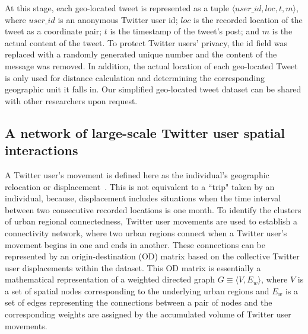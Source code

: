 \documentclass[]{tGIS2e}
\begin{document}
At this stage, each geo-located tweet is represented as a tuple $\langle user\_id, loc, t, m \rangle$, where $user\_id$ is an anonymous Twitter user id; $loc$ is the recorded location of the tweet as a coordinate pair; $t$ is the timestamp of the tweet's post; and $m$ is the actual content of the tweet. 
To protect Twitter users’ privacy, the id field was replaced with a randomly generated unique number and the content of the message was removed.
In addition, the actual location of each geo-located Tweet is only used for distance calculation and determining the corresponding geographic unit it falls in. 
Our simplified geo-located tweet dataset can be shared with other researchers upon request.

\subsection{A network of large-scale Twitter user spatial interactions}
A Twitter user's movement is defined here as the individual's geographic relocation or displacement~\citep{gonzalez2008}.
This is not equivalent to a ``trip" taken by an individual, because, displacement includes situations when the time interval between two consecutive recorded locations is one month.
To identify the clusters of urban regional connectedness, Twitter user movements are used to establish a connectivity network, where two urban regions connect when a Twitter user's movement begins in one and ends in another.
These connections can be represented by an origin-destination (OD) matrix based on the collective Twitter user displacements within the dataset.
This OD matrix is essentially a mathematical representation of a weighted directed graph $G\equiv\langle V, E_{w}\rangle$, where $V$ is a set of spatial nodes corresponding to the underlying urban regions and $E_{w}$ is a set of edges representing the connections between a pair of nodes and the corresponding weights are assigned by the accumulated volume of Twitter user movements.
\end{document}

